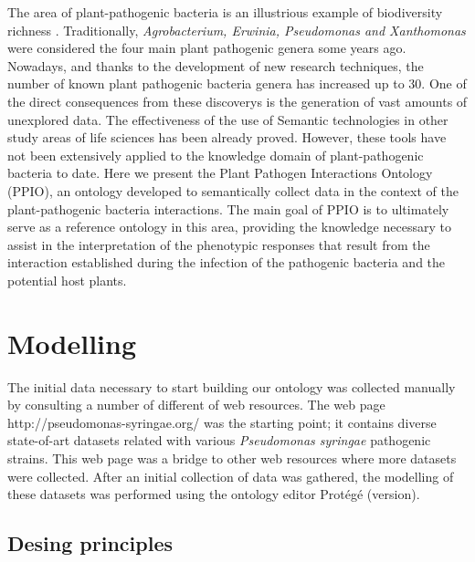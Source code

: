 \documentclass[sw]{iosart2c}
\begin{document}
The area of plant-pathogenic bacteria is an illustrious example of biodiversity richness \cite{Bull2010}. Traditionally, {\itshape Agrobacterium, Erwinia, Pseudomonas and Xanthomonas} were considered the four main plant pathogenic genera some years ago. Nowadays, and thanks to the development of new research techniques, the number of known plant pathogenic bacteria genera has increased up to 30. One of the direct consequences from these discoverys is the generation of vast amounts of unexplored data. The effectiveness of the use of Semantic technologies in other study areas of life sciences has been already proved. However, these tools have not been extensively applied to the knowledge domain of plant-pathogenic bacteria to date. Here we present the Plant Pathogen Interactions Ontology (PPIO), an ontology developed to semantically collect data in the context of the plant-pathogenic bacteria interactions. The main goal of PPIO is to ultimately serve as a reference ontology in this area, providing the knowledge necessary to assist in the interpretation of the phenotypic responses that result from the interaction established during the infection of the pathogenic bacteria and the potential host plants.




\section{Modelling}

The initial data necessary to start building our ontology was collected manually by consulting a number of different of web resources. The web page http://pseudomonas-syringae.org/ was the starting point; it contains diverse state-of-art datasets related with various {\itshape Pseudomonas syringae} pathogenic strains. This web page was a bridge to other web resources where more datasets were collected. After an initial collection of data was gathered, the modelling of these datasets was performed using the ontology editor Prot\'eg\'e (version). 

\subsection{Desing principles}
\end{document}
